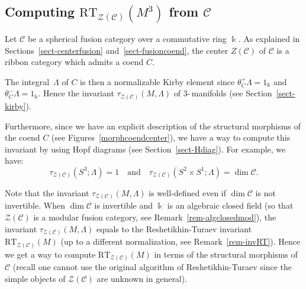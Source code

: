 \documentclass[a4paper]{amsart}
\theoremstyle{definition}
\newcommand{\cc}{\mathcal{C}}
\newcommand{\zz}{\mathcal{Z}}
\newcommand{\kk}{\Bbbk}
\newcommand{\ti}{\mbox{-}\,}
\begin{document}
\subsection{Computing $\mathrm{RT}_{\zz(\cc)}(M^3)$ from $\cc$}\label{soussect-RT}
Let $\cc$ be a spherical fusion category over a commutative ring $\kk$. As explained in Sections~\ref{sect-centerfusion}
and~\ref{sect-fusioncoend}, the center $Z(\cc)$ of $\cc$ is a ribbon category which admits a coend $C$.

The integral~$\Lambda$ of $C$ is then a normalizable Kirby element since $\theta_C^+ \Lambda=1_\kk$ and
$\theta_C^-\Lambda=1_\kk$. Hence the invariant $\tau_{\zz(\cc)}(M,\Lambda)$ of $3$\ti manifolds (see
Section~\ref{sect-kirby}).

Furthermore, since we have an explicit description of the structural morphisms of the coend $C$ (see
Figures~\ref{morphcoendcenter}), we have a way to compute this invariant by using Hopf diagrams (see
Section~\ref{sect-Hdiag}). For example, we have:
\begin{equation*}
\tau_{\zz(\cc)}(S^3;\Lambda)=1 \quad \text{and} \quad \tau_{\zz(\cc)}(S^2 \times S^1;\Lambda)=\dim \cc.
\end{equation*}

Note that the invariant $\tau_{\zz(\cc)}(M,\Lambda)$ is well-defined even if $\dim \cc$ is not invertible. When $\dim \cc$
is invertible and $\kk$ is an algebraic closed field (so that $\zz(\cc)$ is a modular fusion category, see
Remark~\ref{rem-algclosedmod}), the invariant $\tau_{\zz(\cc)}(M,\Lambda)$ equals to the Reshetikhin-Turaev invariant
$\mathrm{RT}_{\zz(\cc)}(M)$ (up to a different normalization, see Remark~\ref{rem-invRT}). Hence we get a way to compute
$\mathrm{RT}_{\zz(\cc)}(M)$ in terms of the structural morphisms of $\cc$ (recall one
cannot use the original algorithm of Reshetikhin-Turaev since the simple objects of $\zz(\cc)$ are unknown in general).
\end{document}
